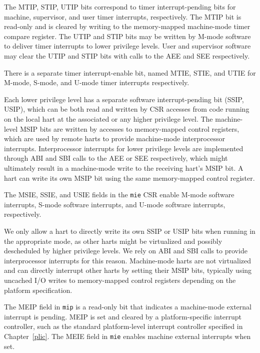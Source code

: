 The MTIP, STIP, UTIP bits correspond to timer interrupt-pending bits
for machine, supervisor, and user timer interrupts, respectively.  The
MTIP bit is read-only and is cleared by writing to the memory-mapped
machine-mode timer compare register.  The UTIP and STIP bits may be
written by M-mode software to deliver timer interrupts to lower
privilege levels.  User and supervisor software may clear the UTIP and
STIP bits with calls to the AEE and SEE respectively.

There is a separate timer interrupt-enable bit, named MTIE, STIE, and
UTIE for M-mode, S-mode, and U-mode timer interrupts respectively.

Each lower privilege level has a separate software interrupt-pending
bit (SSIP, USIP), which can be both read and written by CSR accesses
from code running on the local hart at the associated or any higher
privilege level. The machine-level MSIP bits are written by accesses
to memory-mapped control registers, which are used by remote harts to
provide machine-mode interprocessor interrupts.  Interprocessor
interrupts for lower privilege levels are implemented through ABI and
SBI calls to the AEE or SEE respectively, which might ultimately
result in a machine-mode write to the receiving hart's MSIP bit.  A
hart can write its own MSIP bit using the same memory-mapped control
register.

The MSIE, SSIE, and USIE fields in the {\tt mie} CSR enable M-mode software
interrupts, S-mode software interrupts, and U-mode software interrupts,
respectively.

\begin{commentary}
We only allow a hart to directly write its own SSIP or USIP
bits when running in the appropriate mode, as other harts might be
virtualized and possibly descheduled by higher privilege levels.  We
rely on ABI and SBI calls to provide interprocessor interrupts
for this reason.  Machine-mode harts are not virtualized and can
directly interrupt other harts by setting their MSIP bits, typically
using uncached I/O writes to memory-mapped control registers depending
on the platform specification.
\end{commentary}

The MEIP field in {\tt mip} is a read-only bit that indicates a machine-mode
external interrupt is pending.  MEIP is set and cleared by a platform-specific
interrupt controller, such as the standard platform-level interrupt controller
specified in Chapter~\ref{plic}.  The MEIE field in {\tt mie} enables machine
external interrupts when set.

